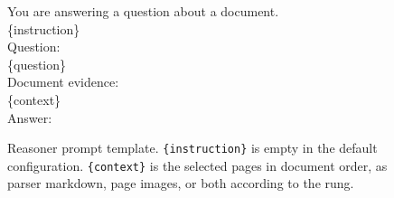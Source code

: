 \begin{figure}[h]
\centering
\begin{tcolorbox}[colback=gray!5,colframe=gray!50,boxrule=0.4pt,fontupper=\small\ttfamily,left=6pt,right=6pt]
You are answering a question about a document.\\[0.4em]
\{instruction\}\\[0.4em]
Question:\\
\{question\}\\[0.4em]
Document evidence:\\
\{context\}\\[0.4em]
Answer:
\end{tcolorbox}
\caption{Reasoner prompt template. \texttt{\{instruction\}} is empty in the default configuration. \texttt{\{context\}} is the selected pages in document order, as parser markdown, page images, or both according to the rung.}
\label{fig:prompt_template}
\end{figure}